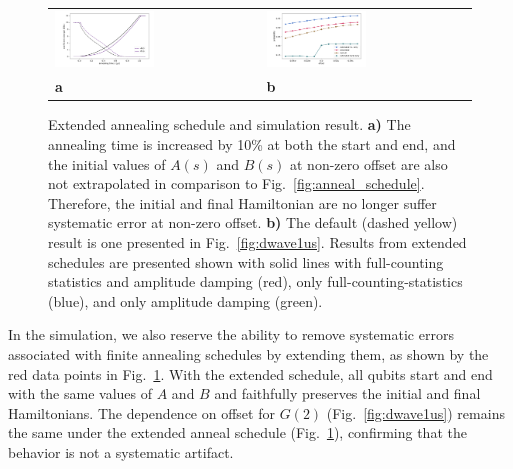 \documentclass[10pt]{iopart}
\begin{document}
\begin{figure}
    \centering
	\begin{tabular}{p{}p{}}
	\includegraphics[width=0.5\textwidth]{./new_figures/anneal_schedule_extended.pdf}
    &
	\includegraphics[width=0.5\textwidth]{./new_figures/NN2_offset_scaling_extended.pdf}\\
	\centering \textbf{a} & \centering \textbf{b}
	\end{tabular}
	\centering
	\caption{Extended annealing schedule and simulation result. \textbf{a)} The annealing time is increased by 10\% at both the start and end, and the initial values of $A(s)$ and $B(s)$ at non-zero offset are also not extrapolated in comparison to Fig.~\ref{fig:anneal_schedule}. Therefore, the initial and final Hamiltonian are no longer suffer systematic error at non-zero offset. \textbf{b)} The default (dashed yellow) result is one presented in Fig.~\ref{fig:dwave1us}. Results from extended schedules are presented shown with solid lines with full-counting statistics and amplitude damping (red), only full-counting-statistics (blue), and only amplitude damping (green).
    }
	\label{fig:anneal_schedule_ext}
\end{figure}

In the simulation, we also reserve the ability to remove systematic errors associated with finite annealing schedules by extending them, as shown by the red data points in Fig.~\ref{fig:anneal_schedule_ext}. With the extended schedule, all qubits start and end with the same values of $A$ and $B$ and faithfully preserves the initial and final Hamiltonians. The dependence on offset for $G(2)$ (Fig.~\ref{fig:dwave1us}) remains the same under the extended anneal schedule (Fig.~\ref{fig:anneal_schedule_ext}), confirming that the behavior is not a systematic artifact.
\end{document}
